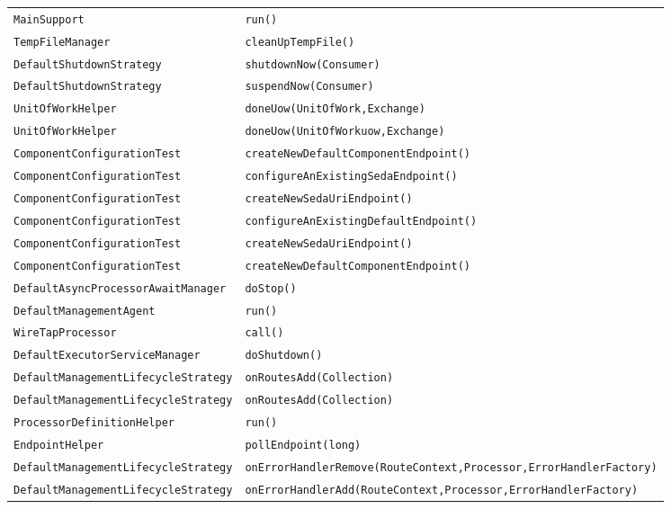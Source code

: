 \begin{center}
\begin{longtable}{ll}
\lstinline/MainSupport/&{\lstinline/run()/}\\
\lstinline/TempFileManager/&{\lstinline/cleanUpTempFile()/}\\
\lstinline/DefaultShutdownStrategy/&{\lstinline/shutdownNow(Consumer)/}\\
\lstinline/DefaultShutdownStrategy/&{\lstinline/suspendNow(Consumer)/}\\
\lstinline/UnitOfWorkHelper/&{\lstinline/doneUow(UnitOfWork,Exchange)/}\\
\lstinline/UnitOfWorkHelper/&{\lstinline/doneUow(UnitOfWorkuow,Exchange)/}\\
\lstinline/ComponentConfigurationTest/&{\lstinline/createNewDefaultComponentEndpoint()/}\\
\lstinline/ComponentConfigurationTest/&{\lstinline/configureAnExistingSedaEndpoint()/}\\
\lstinline/ComponentConfigurationTest/&{\lstinline/createNewSedaUriEndpoint()/}\\
\lstinline/ComponentConfigurationTest/&{\lstinline/configureAnExistingDefaultEndpoint()/}\\
\lstinline/ComponentConfigurationTest/&{\lstinline/createNewSedaUriEndpoint()/}\\
\lstinline/ComponentConfigurationTest/&{\lstinline/createNewDefaultComponentEndpoint()/}\\
\lstinline/DefaultAsyncProcessorAwaitManager/&{\lstinline/doStop()/}\\
\lstinline/DefaultManagementAgent/&{\lstinline/run()/}\\
\lstinline/WireTapProcessor/&{\lstinline/call()/}\\
\lstinline/DefaultExecutorServiceManager/&{\lstinline/doShutdown()/}\\
\lstinline/DefaultManagementLifecycleStrategy/&{\lstinline/onRoutesAdd(Collection)/}\\
\lstinline/DefaultManagementLifecycleStrategy/&{\lstinline/onRoutesAdd(Collection)/}\\
\lstinline/ProcessorDefinitionHelper/&{\lstinline/run()/}\\
\lstinline/EndpointHelper/&{\lstinline/pollEndpoint(long)/}\\
\lstinline/DefaultManagementLifecycleStrategy/&{\lstinline/onErrorHandlerRemove(RouteContext,Processor,ErrorHandlerFactory)/}\\
\lstinline/DefaultManagementLifecycleStrategy/&{\lstinline/onErrorHandlerAdd(RouteContext,Processor,ErrorHandlerFactory)/}\\

\end{longtable}
\end{center}
